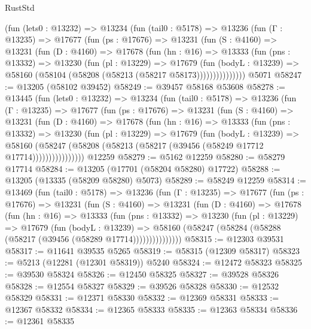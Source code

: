 \begin{lexlean}{RustStd}
\begin{coremodule}
      (fun (lets0 : @13232) =>
      @13234
        (fun (tail0 : @5178) =>
        @13236
          (fun (Γ : @13235) =>
          @17677
            (fun (ps : @17676) =>
            @13231
              (fun (S : @4160) =>
              @13231
                (fun (D : @4160) =>
                @17678
                  (fun (hn : @16) =>
                  @13333
                    (fun (pns : @13332) =>
                    @13230
                      (fun (pl : @13229) =>
                      @17679
                        (fun (bodyL : @13239) =>
                        @58160 (@58104 (@58208 (@58213 (@58217 @58173)))))))))))))))
    @5071
@58247 := @13205 (@58102 @39452)
@58249 := @39457 @58168 @53608
@58278 := @13445
    (fun (lets0 : @13232) =>
    @13234
      (fun (tail0 : @5178) =>
      @13236
        (fun (Γ : @13235) =>
        @17677
          (fun (ps : @17676) =>
          @13231
            (fun (S : @4160) =>
            @13231
              (fun (D : @4160) =>
              @17678
                (fun (hn : @16) =>
                @13333
                  (fun (pns : @13332) =>
                  @13230
                    (fun (pl : @13229) =>
                    @17679
                      (fun (bodyL : @13239) =>
                      @58160
                        (@58247
                          (@58208 (@58213 (@58217 (@39456 (@58249 @17712 @17714))))))))))))))))
    @12259
@58279 := @5162 @12259
@58280 := @58279 @17714
@58284 := @13205 (@17701 (@58204 @58280) @17722)
@58288 := @13205 (@13335 (@58209 @58280) @5073)
@58289 := @58249 @12259
@58314 := @13469
    (fun (tail0 : @5178) =>
    @13236
      (fun (Γ : @13235) =>
      @17677
        (fun (ps : @17676) =>
        @13231
          (fun (S : @4160) =>
          @13231
            (fun (D : @4160) =>
            @17678
              (fun (hn : @16) =>
              @13333
                (fun (pns : @13332) =>
                @13230
                  (fun (pl : @13229) =>
                  @17679
                    (fun (bodyL : @13239) =>
                    @58160 (@58247 (@58284 (@58288 (@58217 (@39456 (@58289 @17714)))))))))))))))
@58315 := @12303 @39531
@58317 := @11641 @39535 @5265
@58319 := @58315 (@12309 @58317)
@58323 := @5213 (@12281 (@12301 @58319)) @5240
@58324 := @12472 @58323
@58325 := @39530 @58324
@58326 := @12450 @58325
@58327 := @39528 @58326
@58328 := @12554 @58327
@58329 := @39526 @58328
@58330 := @12532 @58329
@58331 := @12371 @58330
@58332 := @12369 @58331
@58333 := @12367 @58332
@58334 := @12365 @58333
@58335 := @12363 @58334
@58336 := @12361 @58335

\end{coremodule}
\end{lexlean}
